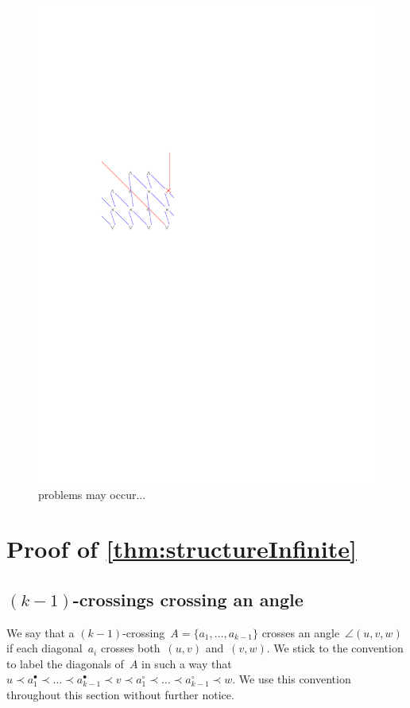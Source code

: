 \documentclass{amsart}
\theoremstyle{remark}
\newcommand{\cl}{\prec}
\begin{document}
\begin{figure}\label{fig:problem}
\includegraphics[width=.98\linewidth,page=2]{latticeRepresentation}
\caption{problems may occur...}
\end{figure}






\section{Proof of \cref{thm:structureInfinite}}

\subsection{$(k-1)$-crossings crossing an angle}

We say that a $(k-1)$-crossing~$A = \{a_1, \dots, a_{k-1}\}$ crosses an angle~$\angle(u,v,w)$ if each diagonal~$a_i$ crosses both~$(u,v)$ and~$(v,w)$. We stick to the convention to label the diagonals of~$A$ in such a way that $u \cl a^\bullet_1 \cl \dots \cl a^\bullet_{k-1} \cl v \cl a^\circ_1 \cl \dots \cl a^\circ_{k-1} \cl w$. We use this convention throughout this section without further notice.
\end{document}
